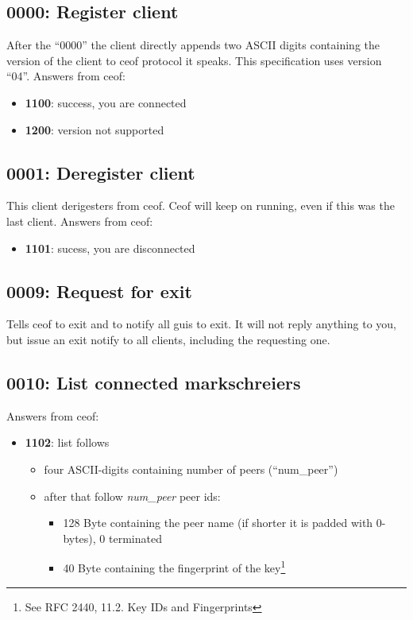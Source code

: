 \documentclass[12pt,a4paper]{book}
\begin{document}
\subsection{0000: Register client}
After the "`0000"' the client directly appends two ASCII digits containing the
version of the client to ceof protocol it speaks. This specification uses version
"`04"'.
Answers from ceof:
\begin{itemize}
\item \textbf{1100}: success, you are connected
\item \textbf{1200}: version not supported
\end{itemize}
\subsection{0001: Deregister client}
This client derigesters from ceof. Ceof will keep on running, even if this
was the last client.
Answers from ceof:
\begin{itemize}
\item \textbf{1101}: sucess, you are disconnected
\end{itemize}
\subsection{0009: Request for exit}
Tells ceof to exit and to notify all guis to exit.
It will not reply anything to you, but issue an exit notify to all clients,
including the requesting one.
\subsection{0010: List connected markschreiers}
Answers from ceof:
\begin{itemize}
\item \textbf{1102}: list follows
\begin{itemize}
\item four ASCII-digits containing number of peers ("`num\_peer"')
\item after that follow \textit{num\_peer} peer ids:
\begin{itemize}
\item 128 Byte containing the peer name (if shorter it is padded with 0-bytes), 0 terminated
\item 40 Byte containing the fingerprint of the
key\footnote{See RFC 2440, 11.2. Key IDs and Fingerprints}
\end{itemize}
\end{itemize}
\end{itemize}
\end{document}
